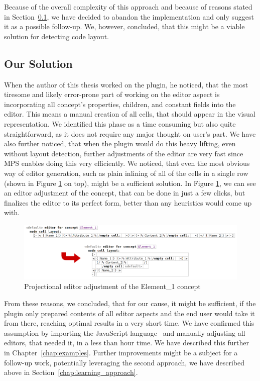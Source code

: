 Because of the overall complexity of this approach and because of reasons stated in Section~\ref{chap:editor_solution}, we have decided to abandon the implementation and only suggest it as a possible follow-up.
We, however, concluded, that this might be a viable solution for detecting code layout.

\subsection{Our Solution}
\label{chap:editor_solution}

When the author of this thesis worked on the plugin, he noticed, that the most tiresome and likely error-prone part of working on the editor aspect is incorporating all concept's properties, children, and constant fields into the editor.
This means a manual creation of all cells, that should appear in the visual representation.
We identified this phase as a time consuming but also quite straightforward, as it does not require any major thought on user's part.
We have also further noticed, that when the plugin would do this heavy lifting, even without layout detection, further adjustments of the editor are very fast since MPS enables doing this very efficiently.
We noticed, that even the most obvious way of editor generation, such as plain inlining of all of the cells in a single row (shown in Figure \ref{fig:editor_adjustment} on top), might be a sufficient solution.
In Figure \ref{fig:editor_adjustment}, we can see an editor adjustment of the  concept, that can be done in just a few clicks, but finalizes the editor to its perfect form, better than any heuristics would come up with.
\\

\begin{figure}[h]
	\centering
	\includegraphics[width=\textwidth]{./img/editor_adjustment.png}
	\caption{Projectional editor adjustment of the Element{\_}1 concept}
	\label{fig:editor_adjustment}
\end{figure}

From these reasons, we concluded, that for our cause, it might be sufficient, if the plugin only prepared contents of all editor aspects and the end user would take it from there, reaching optimal results in a very short time.
We have confirmed this assumption by importing the JavaScript language~\cite{javascript} and manually adjusting all editors, that needed it, in a less than hour time.
We have described this further in Chapter~\ref{chap:examples}.
Further improvements might be a subject for a follow-up work, potentially leveraging the second approach, we have described above in Section~\ref{chap:learning_approach}.

